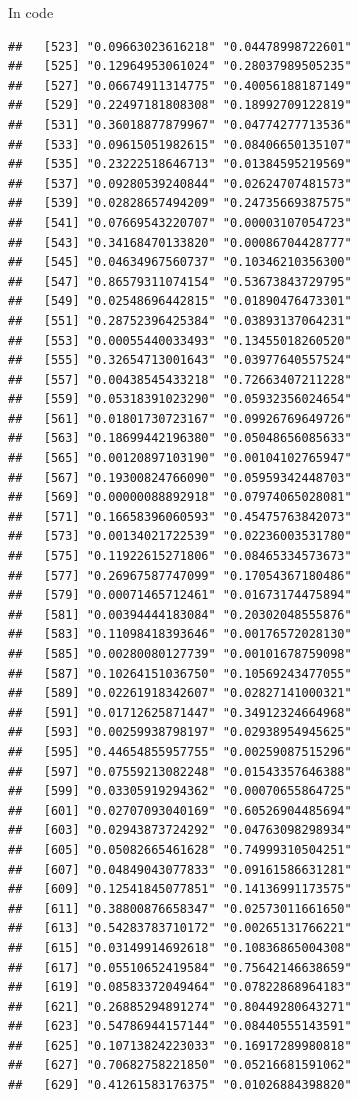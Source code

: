 \documentclass[ignorenonframetext,]{beamer}
\begin{document}
\begin{frame}[fragile]{In code}
\begin{verbatim}
##   [523] "0.09663023616218" "0.04478998722601"
##   [525] "0.12964953061024" "0.28037989505235"
##   [527] "0.06674911314775" "0.40056188187149"
##   [529] "0.22497181808308" "0.18992709122819"
##   [531] "0.36018877879967" "0.04774277713536"
##   [533] "0.09615051982615" "0.08406650135107"
##   [535] "0.23222518646713" "0.01384595219569"
##   [537] "0.09280539240844" "0.02624707481573"
##   [539] "0.02828657494209" "0.24735669387575"
##   [541] "0.07669543220707" "0.00003107054723"
##   [543] "0.34168470133820" "0.00086704428777"
##   [545] "0.04634967560737" "0.10346210356300"
##   [547] "0.86579311074154" "0.53673843729795"
##   [549] "0.02548696442815" "0.01890476473301"
##   [551] "0.28752396425384" "0.03893137064231"
##   [553] "0.00055440033493" "0.13455018260520"
##   [555] "0.32654713001643" "0.03977640557524"
##   [557] "0.00438545433218" "0.72663407211228"
##   [559] "0.05318391023290" "0.05932356024654"
##   [561] "0.01801730723167" "0.09926769649726"
##   [563] "0.18699442196380" "0.05048656085633"
##   [565] "0.00120897103190" "0.00104102765947"
##   [567] "0.19300824766090" "0.05959342448703"
##   [569] "0.00000088892918" "0.07974065028081"
##   [571] "0.16658396060593" "0.45475763842073"
##   [573] "0.00134021722539" "0.02236003531780"
##   [575] "0.11922615271806" "0.08465334573673"
##   [577] "0.26967587747099" "0.17054367180486"
##   [579] "0.00071465712461" "0.01673174475894"
##   [581] "0.00394444183084" "0.20302048555876"
##   [583] "0.11098418393646" "0.00176572028130"
##   [585] "0.00280080127739" "0.00101678759098"
##   [587] "0.10264151036750" "0.10569243477055"
##   [589] "0.02261918342607" "0.02827141000321"
##   [591] "0.01712625871447" "0.34912324664968"
##   [593] "0.00259938798197" "0.02938954945625"
##   [595] "0.44654855957755" "0.00259087515296"
##   [597] "0.07559213082248" "0.01543357646388"
##   [599] "0.03305919294362" "0.00070655864725"
##   [601] "0.02707093040169" "0.60526904485694"
##   [603] "0.02943873724292" "0.04763098298934"
##   [605] "0.05082665461628" "0.74999310504251"
##   [607] "0.04849043077833" "0.09161586631281"
##   [609] "0.12541845077851" "0.14136991173575"
##   [611] "0.38800876658347" "0.02573011661650"
##   [613] "0.54283783710172" "0.00265131766221"
##   [615] "0.03149914692618" "0.10836865004308"
##   [617] "0.05510652419584" "0.75642146638659"
##   [619] "0.08583372049464" "0.07822868964183"
##   [621] "0.26885294891274" "0.80449280643271"
##   [623] "0.54786944157144" "0.08440555143591"
##   [625] "0.10713824223033" "0.16917289980818"
##   [627] "0.70682758221850" "0.05216681591062"
##   [629] "0.41261583176375" "0.01026884398820"

\end{verbatim}
\end{frame}
\end{document}
